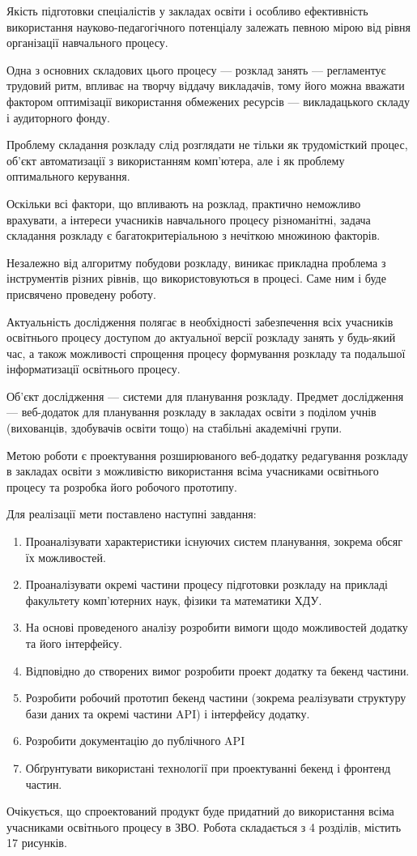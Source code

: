 
Якість підготовки спеціалістів у закладах освіти і особливо ефективність використання науково-педагогічного потенціалу залежать певною мірою від рівня організації навчального процесу.

Одна з основних складових цього процесу — розклад занять — регламентує трудовий ритм, впливає на творчу віддачу викладачів, тому його можна вважати фактором оптимізації використання обмежених ресурсів — викладацького складу і аудиторного фонду.

Проблему складання розкладу слід розглядати не тільки як трудомісткий процес, об'єкт автоматизації з використанням комп’ютера, але і як проблему оптимального керування. 

Оскільки всі фактори, що впливають на розклад, практично неможливо врахувати, а інтереси учасників навчального процесу різноманітні, задача складання розкладу є багатокритеріальною з нечіткою множиною факторів.

Незалежно від алгоритму побудови розкладу, виникає прикладна проблема з інструментів різних рівнів, що використовуються в процесі. Саме ним і буде присвячено проведену роботу.

Актуальність дослідження полягає в необхідності забезпечення всіх учасників освітнього процесу доступом до актуальної версії розкладу занять у будь-який час, а також можливості спрощення процесу формування розкладу та подальшої інформатизації освітнього процесу.

Об’єкт дослідження — системи для планування розкладу. Предмет дослідження —  веб-додаток для планування розкладу в закладах освіти з поділом учнів (вихованців, здобувачів освіти тощо) на стабільні академічні групи.

Метою роботи є проектування розширюваного веб-додатку редагування розкладу в закладах освіти з можливістю використання всіма учасниками освітнього процесу та розробка його робочого прототипу.

Для реалізації мети поставлено наступні завдання:
\begin{enumerate}
	\item Проаналізувати характеристики існуючих систем планування, зокрема обсяг їх можливостей.
	\item Проаналізувати окремі частини процесу підготовки розкладу на прикладі факультету комп’ютерних наук, фізики та математики ХДУ.
	\item На основі проведеного аналізу розробити вимоги щодо можливостей додатку та його інтерфейсу.
	\item Відповідно до створених вимог розробити проект додатку та бекенд частини.
	\item Розробити робочий прототип бекенд частини (зокрема реалізувати структуру бази даних та окремі частини API) і інтерфейсу додатку.
	\item Розробити документацію до публічного API
	\item Обґрунтувати використані технології при проектуванні бекенд і фронтенд частин.
\end{enumerate}

Очікується, що спроектований продукт буде придатний до використання всіма учасниками освітнього процесу в ЗВО.
Робота складається з 4 розділів, містить 17 рисунків.


\clearpage
